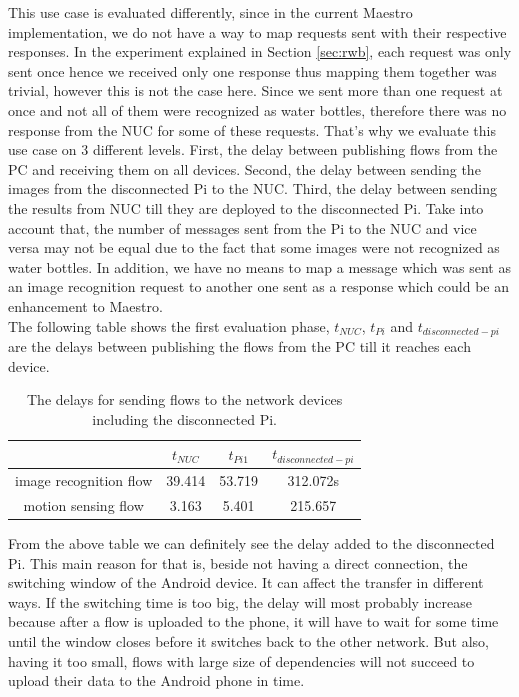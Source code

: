 \noindent This use case is evaluated differently, since in the current Maestro implementation, we do not have a way to map requests sent  with their respective responses. In the experiment explained in Section \ref{sec:rwb}, each request was only sent once hence we received only one response thus mapping them together was trivial, however this is not the case here. Since we sent more than one request at once and not all of them were recognized as  water bottles, therefore there was no response from the NUC for some of these requests. That's why we evaluate this use case on 3 different levels. First, the delay between publishing  flows from the PC and receiving them on all devices. Second, the delay between sending the images from the disconnected Pi to the NUC. Third, the delay between sending the results from NUC till they are deployed to the disconnected Pi.  Take into account that, the number of messages sent from the Pi to the NUC and vice versa may not be equal due to the fact that some images were not recognized as water bottles. In addition, we have no means to map a message which was sent as an image recognition request to another one sent as a response which could be an enhancement to Maestro. \\

\noindent The following table shows the first evaluation phase, $t_{NUC}$, $t_{Pi}$ and $t_{disconnected-pi}$ are the delays between publishing the flows from the PC till it reaches each device.
\begin{table}[H]
	\centering
	\begin{tabular}{c|c|c|c}\toprule
		&$t_{NUC}$  & $t_{Pi1}$  & $t_{disconnected-pi}$ \\ \midrule
		image recognition flow& 39.414&	53.719&	312.072s\\
		motion sensing flow&3.163&	5.401&	215.657\\
	\end{tabular}
	\caption{The delays for sending flows to the network devices including the disconnected Pi.}
	\label{table:DIS}
\end{table}

\noindent From the above table we can definitely see the delay added to the disconnected Pi. This main reason for that  is, beside not having a direct connection, the switching window of the Android device. It can affect the transfer in different ways. If the switching time is too big, the delay will most probably increase because after a flow is uploaded to the phone, it will have to wait for some time until the window closes before it switches back to the other network. But also, having it too small, flows with  large size of dependencies will not succeed to upload their data to the Android phone in time. \\


